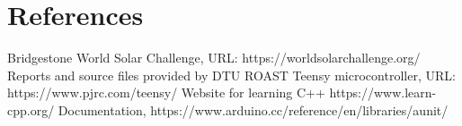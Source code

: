\documentclass[conference]{IEEEtran}
\begin{document}
\section{References}
\begingroup
\renewcommand{\section}[2]{}%
\begin{thebibliography}{}
Bridgestone World Solar Challenge, 
URL: https://worldsolarchallenge.org/
Reports and source files provided by DTU ROAST
Teensy microcontroller,
URL: https://www.pjrc.com/teensy/
Website for learning C++
https://www.learn-cpp.org/
Documentation,
https://www.arduino.cc/reference/en/libraries/aunit/
\end{thebibliography}
\endgroup
\end{document}

